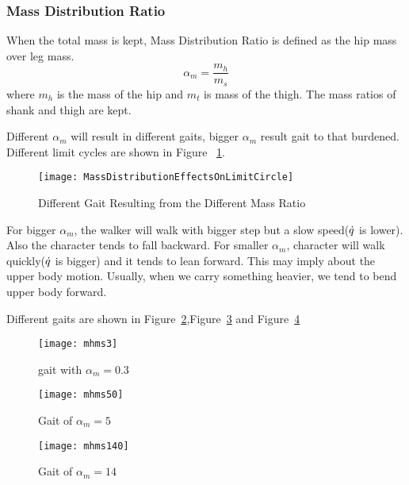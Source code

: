 \subsubsection*{Mass Distribution Ratio}
When the total mass is kept,
Mass Distribution Ratio is defined as the hip mass over leg mass. 
\[
\alpha_m=\frac{m_h}{m_s}
\]
where $m_h$ is the mass of the hip and $m_t$ is mass of the thigh.
The mass ratios of shank and thigh are kept.

Different $\alpha_m$ will result in different gaits, bigger $\alpha_m$ result gait to that burdened.
Different limit cycles are shown in Figure ~\ref{fig:differentmh}.
\begin{figure}[!htbp]
  \begin{center}
     \texttt{[image: MassDistributionEffectsOnLimitCircle]}
    \caption{Different Gait Resulting from the Different Mass Ratio}
    \label{fig:differentmh}
\end{center}
\end{figure}

For bigger $\alpha_m$, the walker will walk with bigger step but a slow speed($\dot{q}$ is lower).
Also the character tends to fall backward.
For smaller $\alpha_m$, character will walk quickly($\dot{q}$ is bigger) and it tends to lean forward.
This may imply about the upper body motion.
Usually, when we carry something heavier, we  tend to bend upper body forward.

Different gaits are shown in Figure~\ref{fig:massh1},Figure~\ref{fig:massh2} and Figure~\ref{fig:massh3}
\begin{figure}[!htbp]
  \begin{center}
      \texttt{[image: mhms3]}
    \caption{gait with $\alpha_m=0.3$}
    \label{fig:massh1}
\end{center}
\end{figure}

\begin{figure}[!htbp]
  \begin{center}
      \texttt{[image: mhms50]}
    \caption{Gait of $\alpha_m=5$}
    \label{fig:massh2}
\end{center}
\end{figure}

\begin{figure}[!htbp]
  \begin{center}
      \texttt{[image: mhms140]}
    \caption{Gait of $\alpha_m=14$}
    \label{fig:massh3}
\end{center}
\end{figure}



